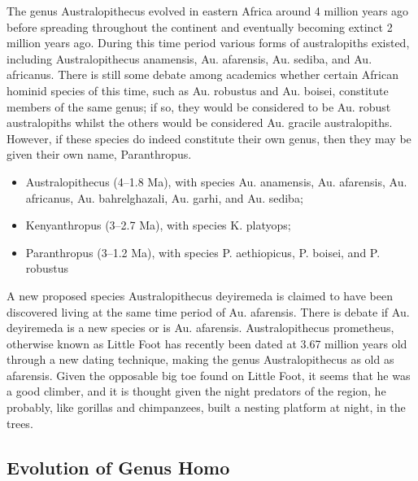The genus Australopithecus evolved in eastern Africa around 4 million years ago before spreading throughout the continent and eventually becoming extinct 2 million years ago. During this time period various forms of australopiths existed, including Australopithecus anamensis, Au. afarensis, Au. sediba, and Au. africanus. There is still some debate among academics whether certain African hominid species of this time, such as Au. robustus and Au. boisei, constitute members of the same genus; if so, they would be considered to be Au. robust australopiths whilst the others would be considered Au. gracile australopiths. However, if these species do indeed constitute their own genus, then they may be given their own name, Paranthropus.

\begin{itemize}
\tightlist
\item
  Australopithecus (4--1.8 Ma), with species Au. anamensis, Au. afarensis, Au. africanus, Au. bahrelghazali, Au. garhi, and Au. sediba;
\item
  Kenyanthropus (3--2.7 Ma), with species K. platyops;
\item
  Paranthropus (3--1.2 Ma), with species P. aethiopicus, P. boisei, and P. robustus
\end{itemize}

A new proposed species Australopithecus deyiremeda is claimed to have been discovered living at the same time period of Au. afarensis. There is debate if Au. deyiremeda is a new species or is Au. afarensis. Australopithecus prometheus, otherwise known as Little Foot has recently been dated at 3.67 million years old through a new dating technique, making the genus Australopithecus as old as afarensis. Given the opposable big toe found on Little Foot, it seems that he was a good climber, and it is thought given the night predators of the region, he probably, like gorillas and chimpanzees, built a nesting platform at night, in the trees.

\hypertarget{evolution-of-genus-homo}{%
\subsection{Evolution of Genus Homo}\label{evolution-of-genus-homo}}

